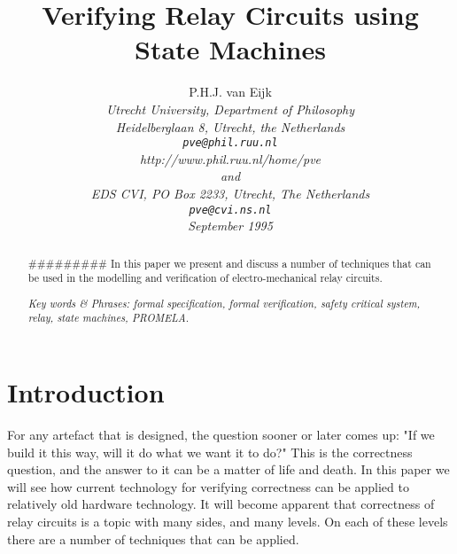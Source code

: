 




\textwidth 15.5cm
\textheight 21.5cm
\parindent 10pt
\oddsidemargin 0.85cm
\evensidemargin 0.37cm
\def\appendix{%
              \setcounter{section}{0}\setcounter{subsection}{0}}


\title{\sf Verifying Relay Circuits using State Machines}
\author{{\sf P.H.J. van Eijk}\\
       {\footnotesize\sl Utrecht University, Department of Philosophy}\\
       {\footnotesize\sl Heidelberglaan 8, Utrecht, the Netherlands}\\
       {\footnotesize\sl \tt pve@phil.ruu.nl} \\
       {\footnotesize\sl http://www.phil.ruu.nl/home/pve} \\
       {\footnotesize\sl and} \\
       {\footnotesize\sl EDS CVI, PO Box 2233, Utrecht, The Netherlands} \\
       {\footnotesize\sl \tt pve@cvi.ns.nl}\\
       {\footnotesize\sl September 1995}
             }
\date{}
\maketitle

\begin{abstract}
\noindent
######### In this paper we present and discuss a number of techniques that can be used in the modelling
and
verification of electro-mechanical
relay circuits.



\noindent
\footnotesize
{\sl Key words \& Phrases: formal specification, formal verification,
safety critical system, relay, state machines, PROMELA.}
\end{abstract}

\thispagestyle{empty}

\section{Introduction}\label{intro}

For any artefact that is designed, the question sooner or later comes up:
"If we build it this way, will it do what we want it to do?"
This is the correctness question, and the answer to it can be a matter of life and death.
In this paper we will see how current technology for verifying
correctness can be applied
to relatively old hardware technology.
It will become apparent that correctness of relay circuits is a topic with
many sides, and many levels.
On each of these levels there are a number of techniques that can be applied.

